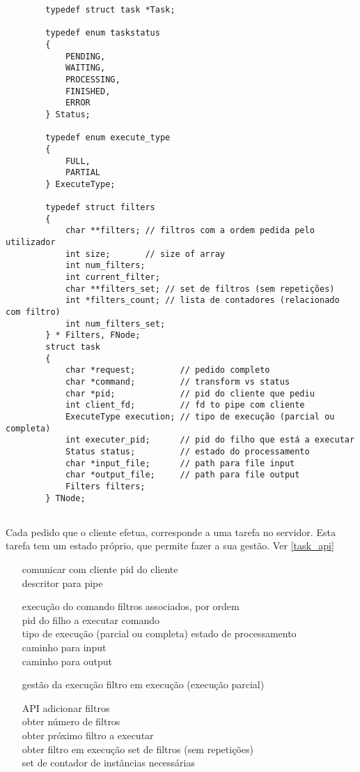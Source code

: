 \documentclass[11pt]{article}
\begin{document}
\begin{verbatim}
        typedef struct task *Task;

        typedef enum taskstatus
        {
            PENDING,
            WAITING,
            PROCESSING,
            FINISHED,
            ERROR
        } Status;

        typedef enum execute_type
        {
            FULL,
            PARTIAL
        } ExecuteType;

        typedef struct filters
        {
            char **filters; // filtros com a ordem pedida pelo utilizador
            int size;       // size of array
            int num_filters;
            int current_filter;
            char **filters_set; // set de filtros (sem repetições)
            int *filters_count; // lista de contadores (relacionado com filtro)
            int num_filters_set;
        } * Filters, FNode;
        struct task
        {
            char *request;         // pedido completo
            char *command;         // transform vs status
            char *pid;             // pid do cliente que pediu
            int client_fd;         // fd to pipe com cliente
            ExecuteType execution; // tipo de execução (parcial ou completa)
            int executer_pid;      // pid do filho que está a executar
            Status status;         // estado do processamento
            char *input_file;      // path para file input
            char *output_file;     // path para file output
            Filters filters;
        } TNode;
    
\end{verbatim}

Cada pedido que o cliente efetua, corresponde a uma tarefa no servidor. Esta tarefa tem um estado próprio,
que permite fazer a sua gestão. Ver \ref{task_api}

\begin{itemize}
    \item [comunicar com cliente] {pid do cliente\\ descritor para pipe}
    \item [execução do comando] {filtros associados, por ordem \\ pid do filho a executar comando \\ tipo de execução (parcial ou completa)
          estado de processamento \\ caminho para input \\ caminho para output}
    \item [gestão da execução] { filtro em execução (execução parcial)}
    \item [API] {adicionar filtros \\ obter número de filtros \\ obter próximo filtro a executar \\ obter filtro em execução
          set de filtros (sem repetições) \\ set de contador de instâncias necessárias}
\end{itemize}
\end{document}
